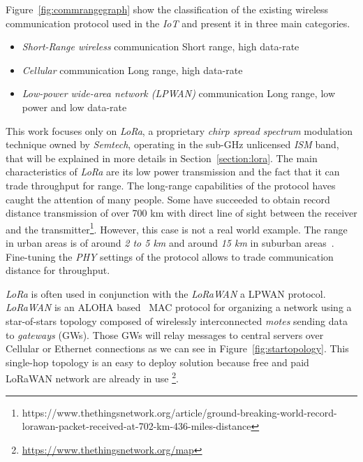 Figure~\ref{fig:commrangegraph} show the classification
of the existing wireless communication protocol used in the \emph{IoT} and
present it in three main categories.

\begin{itemize}
    \item \emph{Short-Range wireless} communication Short range, high data-rate
    \item \emph{Cellular} communication Long range, high data-rate
    \item \emph{Low-power wide-area network (LPWAN)} communication Long range, low power and low data-rate
\end{itemize}



This work focuses only on \emph{LoRa}, a proprietary \emph{chirp spread spectrum}
modulation technique owned by \emph{Semtech}, operating in the sub-GHz
unlicensed \emph{ISM} band, that will be explained in more details in 
Section~\ref{section:lora}.
The main characteristics of \emph{LoRa} are its low power transmission and the
fact that it can trade throughput for range.
The long-range capabilities of the protocol haves caught the attention of
many people. 
Some have succeeded to obtain record distance transmission of over 700 km with
direct line of sight between the receiver and the
transmitter\footnote{https://www.thethingsnetwork.org/article/ground-breaking-world-record-lorawan-packet-received-at-702-km-436-miles-distance}.
However, this case is not a real world example. The range in urban areas is of
around \emph{2 to 5 km} and around \emph{15 km} in suburban
areas~\cite{8030482}.
Fine-tuning the \emph{PHY} settings of the protocol
allows to trade communication distance for throughput.

\emph{LoRa} is often used in conjunction with the \emph{LoRaWAN} a 
LPWAN protocol.
\emph{LoRaWAN} is an ALOHA based~\cite{loraalliance:lorawanspecification}
MAC protocol for organizing a network
using a star-of-stars topology composed of wirelessly interconnected 
\emph{motes} sending data to \emph{gateways} (GWs). 
Those GWs will relay messages to central servers over Cellular or Ethernet
connections as we can see in Figure~\ref{fig:startopology}.
This single-hop topology is an easy to deploy solution because free and paid
LoRaWAN network are already in use
\footnote{\url{https://www.thethingsnetwork.org/map}}.

